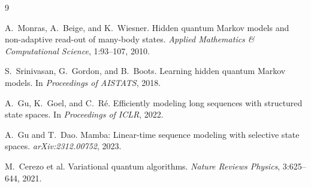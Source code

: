 \documentclass[11pt,a4paper]{article}
\theoremstyle{plain}
\begin{document}
\begin{thebibliography}{9}

A.~Monras, A.~Beige, and K.~Wiesner.
\newblock Hidden quantum Markov models and non-adaptive read-out of many-body
  states.
\newblock \emph{Applied Mathematics \& Computational Science}, 1:93--107, 2010.

S.~Srinivasan, G.~Gordon, and B.~Boots.
\newblock Learning hidden quantum Markov models.
\newblock In \emph{Proceedings of AISTATS}, 2018.

A.~Gu, K.~Goel, and C.~Ré.
\newblock Efficiently modeling long sequences with structured state spaces.
\newblock In \emph{Proceedings of ICLR}, 2022.

A.~Gu and T.~Dao.
\newblock Mamba: Linear-time sequence modeling with selective state spaces.
\newblock \emph{arXiv:2312.00752}, 2023.

M.~Cerezo et al.
\newblock Variational quantum algorithms.
\newblock \emph{Nature Reviews Physics}, 3:625--644, 2021.

\end{thebibliography}
\end{document}

